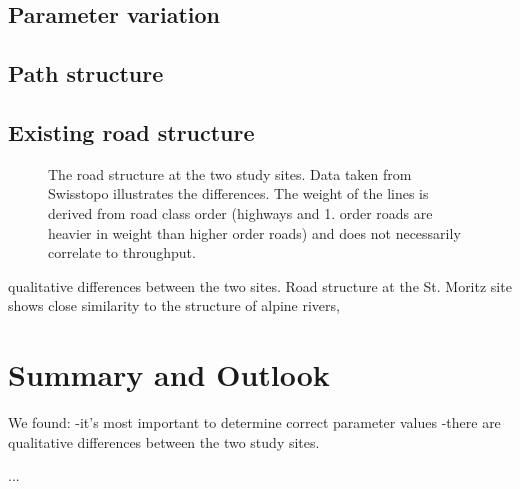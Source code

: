 \documentclass[a4paper, DIV11, abstracton]{scrartcl}
\begin{document}
\subsection{Parameter variation}


\subsection{Path structure}


\subsection{Existing road structure}

\begin{figure}[tbp]
	\caption{The road structure at the two study sites. Data taken from Swisstopo illustrates the differences. The weight of the lines is derived from road class order (highways and 1. order roads are heavier in weight than higher order roads) and does not necessarily correlate to throughput.}
	\label{fig:roads}
\end{figure}

qualitative differences between the two sites. Road structure at the St. Moritz site shows close similarity to the structure of alpine rivers, 




\section{Summary and Outlook}
We found:
-it's most important to determine correct parameter values
-there are qualitative differences between the two study sites.

%
%

\renewcommand{\refname}{\section{Sources}} %
\begin{thebibliography}{99}
...
\end{thebibliography}
\end{document}
